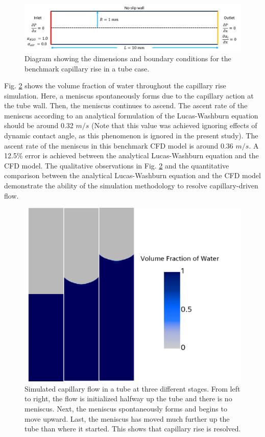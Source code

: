 \documentclass[%
 aip,
 amsmath,amssymb,
 reprint,%
]{revtex4-1}
\begin{document}
\begin{figure}
    \centering
    \includegraphics[width=\linewidth]{Figures/capillaryRiseDiagram.png}
    \caption{Diagram showing the dimensions and boundary conditions for the benchmark capillary rise in a tube case.}
    \label{fig:benchmark_diagram}
\end{figure}

Fig. \ref{fig:capillaryRise} shows the volume fraction of water throughout the capillary rise simulation. Here, a meniscus spontaneously forms due to the capillary action at the tube wall. Then, the meniscus continues to ascend. The ascent rate of the meniscus according to an analytical formulation of the Lucas-Washburn equation \cite{HAMRAOUI2002415} should be around 0.32 $m/s$  (Note that this value was achieved ignoring effects of dynamic contact angle, as this phenomenon is ignored in the present study). The ascent rate of the meniscus in this benchmark CFD model is around 0.36 $m/s$. A 12.5\% error is achieved between the analytical Lucas-Washburn equation and the CFD model. The qualitative observations in Fig. \ref{fig:capillaryRise} and the quantitative comparison between the analytical Lucas-Washburn equation and the CFD model demonstrate the ability of the simulation methodology to resolve capillary-driven flow. 

\begin{figure}
    \centering
    \includegraphics[width=\linewidth]{Figures/validation_capillaryRise.png}
    \caption{Simulated capillary flow in a tube at three different stages. From left to right, the flow is initialized halfway up the tube and there is no meniscus. Next, the meniscus spontaneously forms and begins to move upward. Last, the meniscus has moved much further up the tube than where it started. This shows that capillary rise is resolved.}
    \label{fig:capillaryRise}
\end{figure}
\end{document}
